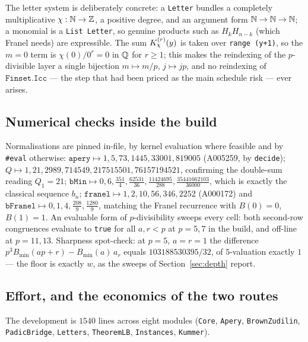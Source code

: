 The letter system is deliberately concrete: a \texttt{Letter} bundles a completely
multiplicative $\chi:\mathbb{N}\to\mathbb{Z}$, a positive degree, and an argument form
$\mathbb{N}\to\mathbb{N}\to\mathbb{N}$; a monomial is a \texttt{List Letter}, so genuine products such as
$H_kH_{n-k}$ (which Franel needs) are expressible. The sum $K^{(r)}_{\chi}(y)$ is taken over
\texttt{range (y+1)}, so the $m=0$ term is $\chi(0)/0^r=0$ in $\mathbb{Q}$ for $r\ge1$; this makes
the reindexing of the $p$-divisible layer a single bijection $m\mapsto m/p$,
$j\mapsto jp$, and no reindexing of $\texttt{Finset.Icc}$ --- the step that had been
priced as the main schedule risk --- ever arises.

\subsection{Numerical checks inside the build}

Normalisations are pinned in-file, by kernel evaluation where feasible and by
\texttt{\#eval} otherwise:
$\texttt{apery}\mapsto1,5,73,1445,33001,819005$ (A005259, by \texttt{decide});
$Q\mapsto1,21,2989,714549,217515501,76157194521$, confirming the double-sum reading
$Q_1=21$; $\texttt{bMin}\mapsto0,6,\tfrac{351}4,\tfrac{62531}{36},\tfrac{11424695}{288},
\tfrac{35441662103}{36000}$, which is exactly the classical sequence $b_n$;
$\texttt{franel}\mapsto1,2,10,56,346,2252$ (A000172) and
$\texttt{bFranel}\mapsto0,1,4,\tfrac{208}9,\tfrac{1280}9$, matching the Franel recurrence
with $B(0)=0$, $B(1)=1$. An evaluable form of $p$-divisibility sweeps every cell:
both second-row congruences evaluate to \texttt{true} for all $a,r<p$ at $p=5,7$ in the
build, and off-line at $p=11,13$. Sharpness spot-check: at $p=5$, $a=r=1$ the difference
$p^3B_{\min}(ap+r)-B_{\min}(a)\,a_r$ equals $103188530395/32$, of $5$-valuation exactly
$1$ --- the floor is exactly $w$, as the sweeps of Section~\ref{sec:depth} report.

\subsection{Effort, and the economics of the two routes}

The development is $1540$ lines across eight modules
(\texttt{Core}, \texttt{Apery}, \texttt{BrownZudilin}, \texttt{PadicBridge},
\texttt{Letters}, \texttt{TheoremLB}, \texttt{Instances}, \texttt{Kummer}).

